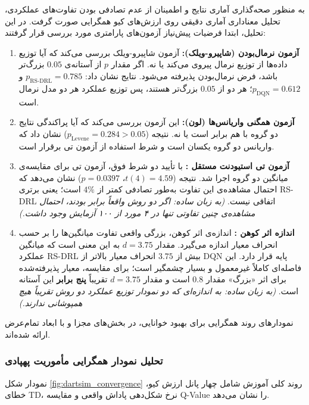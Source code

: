 \documentclass[oneside,openany,a4paper,12pt]{article}
\begin{document}
به منظور صحه‌گذاری آماری نتایج و اطمینان از عدم تصادفی بودن تفاوت‌های عملکردی، تحلیل معناداری آماری دقیقی روی ارزش‌های کیو همگرایی صورت گرفت. در این تحلیل، ابتدا فرضیات پیش‌نیاز آزمون‌های پارامتری مورد بررسی قرار گرفتند:
\begin{enumerate}
    \item \textbf{آزمون نرمال‌بودن (شاپیرو-ویلک):} آزمون شاپیرو-ویلک بررسی می‌کند که آیا توزیع داده‌ها از توزیع نرمال پیروی می‌کند یا نه. اگر مقدار $p$ از آستانه‌ی $0.05$ بزرگ‌تر باشد، فرض نرمال‌بودن پذیرفته می‌شود. نتایج نشان داد: $p_{\text{RS-DRL}} = 0.785$ و $p_{\text{DQN}} = 0.612$؛ هر دو از $0.05$ بزرگ‌تر هستند، پس توزیع عملکرد هر دو مدل نرمال است.
    \item \textbf{آزمون همگنی واریانس‌ها (لون):} این آزمون بررسی می‌کند که آیا پراکندگی نتایج دو گروه با هم برابر است یا نه. نتیجه ($p_{\text{Levene}} = 0.284 > 0.05$) نشان داد که واریانس دو گروه یکسان است و شرط استفاده از آزمون تی برقرار است.
    \item \textbf{آزمون تی استیودنت مستقل :} با تأیید دو شرط فوق، آزمون تی برای مقایسه‌ی میانگین دو گروه اجرا شد. نتیجه ($t(4) = 4.59$، $p = 0.0397$) نشان می‌دهد که احتمال مشاهده‌ی این تفاوت به‌طور تصادفی کمتر از $4\%$ است؛ یعنی برتری RS-DRL اتفاقی نیست. \textit{(به زبان ساده: اگر دو روش واقعاً برابر بودند، احتمال مشاهده‌ی چنین تفاوتی تنها در ۴ مورد از ۱۰۰ آزمایش وجود داشت.)}
    \item \textbf{اندازه اثر کوهن :} اندازه‌ی اثر کوهن، بزرگی واقعی تفاوت میانگین‌ها را بر حسب انحراف معیار اندازه می‌گیرد. مقدار $d = 3.75$ به این معنی است که میانگین عملکرد RS-DRL بیش از $3.75$ انحراف معیار بالاتر از DQN پایه قرار دارد. این فاصله‌ای کاملاً غیرمعمول و بسیار چشمگیر است؛ برای مقایسه، معیار پذیرفته‌شده برای اثر «بزرگ» مقدار $0.8$ است و مقدار $d = 3.75$ تقریباً \textbf{پنج برابر} این آستانه است. \textit{(به زبان ساده: به اندازه‌ای که دو نمودار توزیع عملکرد دو روش تقریباً هیچ همپوشانی ندارند.)}
\end{enumerate}
 

نمودارهای روند همگرایی برای بهبود خوانایی، در بخش‌های مجزا و با ابعاد تمام‌عرض ارائه شده‌اند.

\clearpage
\subsubsection{تحلیل نمودار همگرایی مأموریت پهپادی}
نمودار شکل \ref{fig:dartsim_convergence} روند کلی آموزش شامل چهار پانل ارزش کیو، خطای TD، نرخ شکل‌دهی پاداش واقعی و مقایسه Q-Value را نشان می‌دهد.
\end{document}
